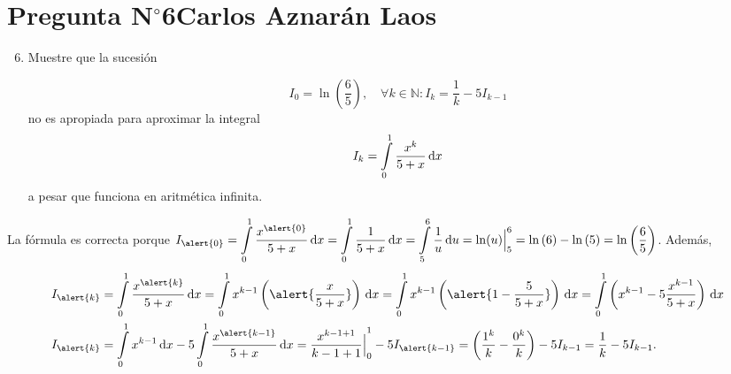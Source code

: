 \section{Pregunta N$^{\circ}$6\qquad Carlos Aznarán Laos}

\begin{frame}
	\begin{enumerate}\setcounter{enumi}{5}
		\item

		      Muestre que la sucesión

		      \begin{equation*}
			      I_{0}=\ln\left(\frac{6}{5}\right),\quad
			      \forall k\in\mathbb{N}:
			      I_{k}=\frac{1}{k}-5I_{k-1}
		      \end{equation*}
		      no es apropiada para aproximar la integral
		      \begin{equation*}
			      I_{k}=
			      \int\limits_{0}^{1}
			      \frac{x^{k}}{5+x}
			      \dl x
		      \end{equation*}
		      a pesar que funciona en aritmética infinita.
	\end{enumerate}
	\begin{solution}
		La fórmula es correcta porque
		\begin{math}
			\displaystyle
			I_{\alert{0}}=
			\int\limits_{0}^{1}
			\frac{x^{\alert{0}}}{5+x}
			\dl x=
			\int\limits_{0}^{1}
			\frac{1}{5+x}
			\dl x=
			\int\limits_{5}^{6}
			\frac{1}{u}
			\dl u
			=
			{
			\ln(u)
			\Bigr|
			}_{5}^{6}
			=
			\ln\left(6\right)-
			\ln\left(5\right)=
			\ln\left(\frac{6}{5}\right)
		\end{math}.
		Además,
		\begin{align*}
			I_{\alert{k}} & =
			\int\limits_{0}^{1}
			\frac{x^{\alert{k}}}{5+x}
			\dl x=
			\int\limits_{0}^{1}
			x^{k-1}
			\left(\alert{\frac{x}{5+x}}\right)
			\dl x=
			\int\limits_{0}^{1}
			x^{k-1}
			\left(\alert{1-\frac{5}{5+x}}\right)
			\dl x=
			\int\limits_{0}^{1}
			\left(x^{k-1}-5\frac{x^{k-1}}{5+x}\right)
			\dl x             \\
			I_{\alert{k}} & =
			\int\limits_{0}^{1}
			x^{k-1}
			\dl x-
			5
			\int\limits_{0}^{1}
			\frac{x^{\alert{k-1}}}{5+x}
			\dl x=
			{
			\frac{x^{k-1+1}}{k-1+1}
			\Bigr|
			}_{0}^{1}
			-5I_{\alert{k-1}}=
			\left(\frac{1^{k}}{k}-\frac{0^{k}}{k}\right)-5I_{k-1}=
			\frac{1}{k}-5I_{k-1}.
		\end{align*}
	\end{solution}
\end{frame}


